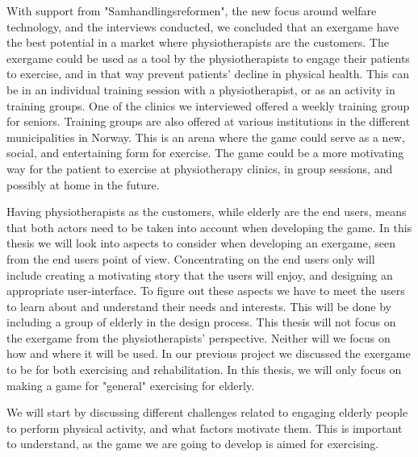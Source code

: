 With support from "Samhandlingsreformen", the new focus around welfare technology, and the interviews conducted, we concluded that an exergame have the best potential in a market where physiotherapists are the customers. The exergame could be used as a tool by the physiotherapists to engage their patients to exercise, and in that way prevent patients' decline in physical health. This can be in an individual training session with a physiotherapist, or as an activity in training groups. One of the clinics we interviewed offered a weekly training group for seniors. Training groups are also offered at various institutions in the different municipalities in Norway. This is an arena where the game could serve as a new, social, and entertaining form for exercise. The game could be a more motivating way for the patient to exercise at physiotherapy clinics, in group sessions, and possibly at home in the future. 

Having physiotherapists as the customers, while elderly are the end users, means that both actors need to be taken into account when developing the game. In this thesis we will look into aspects to consider when developing an exergame, seen from the end users point of view. Concentrating on the end users only will include creating a motivating story that the users will enjoy, and designing an appropriate user-interface. To figure out these aspects we have to meet the users to learn about and understand their needs and interests. This will be done by including a group of elderly in the design process. This thesis will not focus on the exergame from the physiotherapists' perspective. Neither will we focus on how and where it will be used. In our previous project we discussed the exergame to be for both exercising and rehabilitation. In this thesis, we will only focus on making a game for "general" exercising for elderly. 

We will start by discussing different challenges related to engaging elderly people to perform physical activity, and what factors motivate them. This is important to understand, as the game we are going to develop is aimed for exercising.
